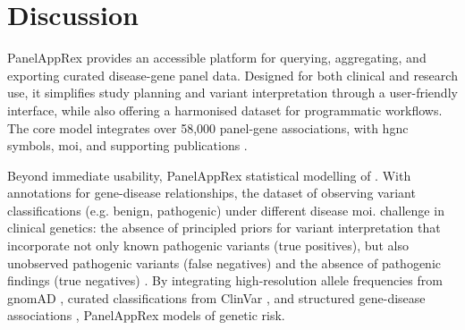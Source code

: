 \section{Discussion}
\noindent
PanelAppRex provides an accessible \DIFdelbegin {}\DIFdelend platform for querying, aggregating, and exporting curated disease-gene panel data\DIFaddbegin {}\DIFaddend .
Designed for both clinical and research use, it simplifies study planning and variant interpretation through a user-friendly interface, while also offering a harmonised dataset for programmatic workflows. 
The core model integrates over 58,000 panel-gene associations, with \DIFdelbegin {}\DIFdelend \DIFaddbegin {}\DIFaddend \ac{hgnc} symbols, \DIFdelbegin {}%
\DIFdelend \ac{moi}, \DIFaddbegin {}\DIFaddend and supporting publications \DIFaddbegin {}\DIFaddend .

Beyond immediate usability, PanelAppRex \DIFdelbegin {}\DIFdelend \DIFaddbegin {}\DIFaddend statistical modelling of \DIFdelbegin {}\DIFdelend \DIFaddbegin {}\DIFaddend . 
With annotations for gene-disease relationships, the dataset \DIFdelbegin {}\DIFdelend \DIFaddbegin {}\DIFaddend of observing variant classifications (e.g. benign, pathogenic) under different disease \ac{moi}. 
\DIFdelbegin {}\DIFdelend \DIFaddbegin {}\DIFaddend challenge in clinical genetics: the absence of principled priors for variant interpretation that incorporate not only known pathogenic variants (true positives), but also unobserved pathogenic variants (false negatives) and the absence of pathogenic findings (true negatives) \cite{hannah_using_2024, zschocke_mendelian_2023}. 
By integrating high-resolution allele frequencies from gnomAD \cite{karczewski2020mutational}, curated classifications from ClinVar \cite{landrum_clinvar_2018}, and structured gene-disease associations \cite{martin_panelapp_2019}, 
PanelAppRex \DIFdelbegin {}\DIFdelend \DIFaddbegin {}\DIFaddend models of genetic risk.

